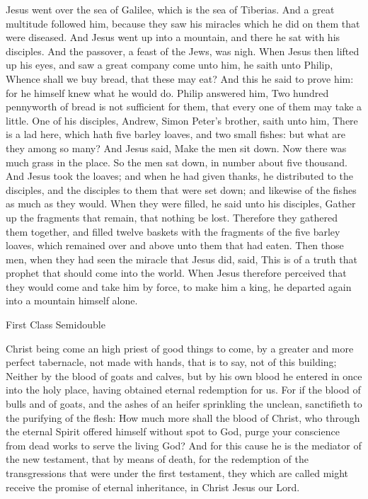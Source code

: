  Jesus went over the sea of Galilee, which is the sea of Tiberias. And a great multitude followed him, because they saw his miracles which he did on them that were diseased. And Jesus went up into a mountain, and there he sat with his disciples. And the passover, a feast of the Jews, was nigh. When Jesus then lifted up his eyes, and saw a great company come unto him, he saith unto Philip, Whence shall we buy bread, that these may eat? And this he said to prove him: for he himself knew what he would do. Philip answered him, Two hundred pennyworth of bread is not sufficient for them, that every one of them may take a little. One of his disciples, Andrew, Simon Peter's brother, saith unto him, There is a lad here, which hath five barley loaves, and two small fishes: but what are they among so many? And Jesus said, Make the men sit down. Now there was much grass in the place. So the men sat down, in number about five thousand. And Jesus took the loaves; and when he had given thanks, he distributed to the disciples, and the disciples to them that were set down; and likewise of the fishes as much as they would. When they were filled, he said unto his disciples, Gather up the fragments that remain, that nothing be lost. Therefore they gathered them together, and filled twelve baskets with the fragments of the five barley loaves, which remained over and above unto them that had eaten. Then those men, when they had seen the miracle that Jesus did, said, This is of a truth that prophet that should come into the world. When Jesus therefore perceived that they would come and take him by force, to make him a king, he departed again into a mountain himself alone.

\label{PassionSunday}
\begin{inhead}
{First Class Semidouble}
\end{inhead}

 Christ being come an high priest of good things to come, by a greater and more perfect tabernacle, not made with hands, that is to say, not of this building; Neither by the blood of goats and calves, but by his own blood he entered in once into the holy place, having obtained eternal redemption for us. For if the blood of bulls and of goats, and the ashes of an heifer sprinkling the unclean, sanctifieth to the purifying of the flesh: How much more shall the blood of Christ, who through the eternal Spirit offered himself without spot to God, purge your conscience from dead works to serve the living God? And for this cause he is the mediator of the new testament, that by means of death, for the redemption of the transgressions that were under the first testament, they which are called might receive the promise of eternal inheritance, in Christ Jesus our Lord.


